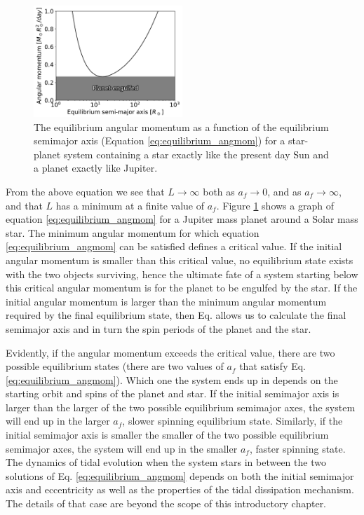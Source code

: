\begin{figure}[t]
%
    \centering
%
    \includegraphics[width=0.5\textwidth]{equilibrium_angmom.pdf}
%
    \caption{
%
        The equilibrium angular momentum as a function of the equilibrium
        semimajor axis (Equation \eqref{eq:equilibrium_angmom}) for a
        star-planet system containing a star exactly like the present day Sun
        and a planet exactly like Jupiter.
%
    }
%
    \label{fig:equilibrium_angmom}
%
\end{figure}


From the above equation we see that $L \rightarrow \infty$ both as $a_f
\rightarrow 0$, and as $a_f \rightarrow \infty$, and that $L$ has a minimum
at a finite value of $a_f$. Figure \ref{fig:equilibrium_angmom} shows a graph of
equation \eqref{eq:equilibrium_angmom} for a Jupiter mass planet around a Solar
mass star. The minimum angular momentum for which equation
\eqref{eq:equilibrium_angmom} can be satisfied defines a critical value.  If the
initial angular momentum is smaller than this critical value, no equilibrium
state exists with the two objects surviving, hence the ultimate fate of a system
starting below this critical angular momentum is for the planet to be engulfed
by the star. If the initial angular momentum is larger than the minimum angular
momentum required by the final equilibrium state, then Eq.
\label{eq:equilibrium_angmom} allows us to calculate the final semimajor axis
and in turn the spin periods of the planet and the star.

Evidently, if the angular momentum exceeds the critical value, there are two
possible equilibrium states (there are two values of $a_f$ that satisfy Eq.
\eqref{eq:equilibrium_angmom}). Which one the system ends up in depends on the
starting orbit and spins of the planet and star. If the initial semimajor axis
is larger than the larger of the two possible equilibrium semimajor axes, the
system will end up in the larger $a_f$, slower spinning equilibrium state.
Similarly, if the initial semimajor axis is smaller the smaller of the two
possible equilibrium semimajor axes, the system will end up in the smaller
$a_f$, faster spinning state. The dynamics of tidal evolution when the system
stars in between the two solutions of Eq. \eqref{eq:equilibrium_angmom} depends
on both the initial semimajor axis and eccentricity as well as the properties of
the tidal dissipation mechanism. The details of that case are beyond the scope
of this introductory chapter.

